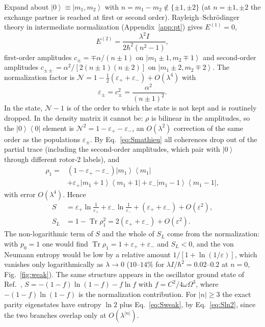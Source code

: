 \documentclass[pra,twocolumn,superscriptaddress,longbibliography,floatfix]{revtex4-2}
\newcommand{\Tr}{\operatorname{Tr}}
\newcommand{\ket}[1]{\left|#1\right\rangle}
\newcommand{\ketbra}[2]{\left|#1\right\rangle\!\left\langle#2\right|}
\newcommand{\epsp}{\varepsilon_{+}}
\newcommand{\epsm}{\varepsilon_{-}}
\begin{document}
Expand about $\ket{0}\equiv\ket{m_{1},m_{2}}$ with $n=m_{1}-m_{2}\notin
\{\pm1,\pm2\}$ (at $n=\pm1,\pm2$ the exchange partner is reached at first or
second order). Rayleigh--Schr\"odinger theory in intermediate normalization
(Appendix~\ref{app:pt}) gives $E^{(1)}=0$,
\begin{equation}
E^{(2)}=\frac{\lambda^{2}I}{2\hbar^{2}\left(n^{2}-1\right)},
\label{eq:E2}
\end{equation}
first-order amplitudes $c_{\pm}=\mp\alpha/(n\pm1)$ on $\ket{m_{1}\pm1,m_{2}\mp1}$
and second-order amplitudes $c_{\pm\pm}=\alpha^{2}/[2(n\pm1)(n\pm2)]$ on
$\ket{m_{1}\pm2,m_{2}\mp2}$. The normalization factor is
$\mathcal{N}=1-\tfrac12(\epsp+\epsm)+O(\lambda^{4})$ with
\begin{equation}
\varepsilon_{\pm}=c_{\pm}^{2}=\frac{\alpha^{2}}{(n\pm1)^{2}} .
\label{eq:eps}
\end{equation}
In the state, $\mathcal{N}-1$ is of the order to which the state is not kept and
is routinely dropped. In the density matrix it cannot be: $\rho$ is bilinear in
the amplitudes, so the $\ketbra00$ element is $\mathcal{N}^{2}=1-\epsp-\epsm$, an
$O(\lambda^{2})$ correction of the same order as the populations
$\varepsilon_{\pm}$. By Eq.~\eqref{eq:Smathieu} all coherences drop out of the
partial trace (including the second-order amplitudes, which pair with $\ket0$
through different rotor-2 labels), and
\begin{equation}
\begin{split}
\rho_{1}={}&\left(1-\epsp-\epsm\right)\ketbra{m_{1}}{m_{1}}\\
&+\epsp\ketbra{m_{1}{+}1}{m_{1}{+}1}+\epsm\ketbra{m_{1}{-}1}{m_{1}{-}1},
\end{split}
\label{eq:rho1}
\end{equation}
with error $O(\lambda^{4})$. Hence
\begin{align}
S&=\epsp\ln\frac{1}{\epsp}+\epsm\ln\frac{1}{\epsm}+\left(\epsp+\epsm\right)
+O(\varepsilon^{2}),\label{eq:Sweak}\\
S_{L}&=1-\Tr\rho_{1}^{2}=2\left(\epsp+\epsm\right)+O(\varepsilon^{2}).
\label{eq:SL}
\end{align}
The non-logarithmic term of $S$ and the whole of $S_{L}$ come from the
normalization: with $p_{0}=1$ one would find $\Tr\rho_{1}=1+\epsp+\epsm$ and
$S_{L}<0$, and the von Neumann entropy would be low by a relative amount
$1/[1+\ln(1/\varepsilon)]$, which vanishes only logarithmically as
$\lambda\to0$ ($10$--$14\%$ for $\lambda I/\hbar^{2}=0.02$--$0.2$ at $n=0$,
Fig.~\ref{fig:weak}). The same structure appears in the oscillator ground state
of Ref.~\cite{DKS}, $S=-(1-f)\ln(1-f)-f\ln f$ with $f=C^{2}/4\omega\Omega^{3}$,
where $-(1-f)\ln(1-f)$ is the normalization contribution. For $|n|\ge3$ the
exact parity eigenstates have entropy $\ln2$ plus Eq.~\eqref{eq:Sweak}, by
Eq.~\eqref{eq:Sln2}, since the two branches overlap only at
$O(\lambda^{|n|})$.
\end{document}
